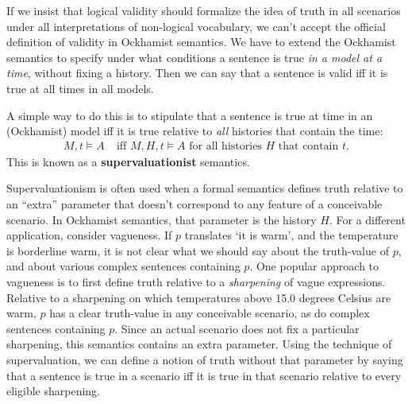 
If we insist that logical validity should formalize the idea of truth in all
scenarios under all interpretations of non-logical vocabulary, we can't
accept the official definition of validity in Ockhamist semantics. We have to
extend the Ockhamist semantics to specify under what conditions a sentence is
true \emph{in a model at a time}, without fixing a history. Then we can say that
a sentence is valid iff it is true at all times in all models.

A simple way to do this is to stipulate that a sentence is true at time in an
(Ockhamist) model iff it is true relative to \emph{all} histories that contain
the time:
\begin{align*}
  M,t \models A & \;\text{iff $M,H,t \models A$ for all histories $H$ that contain $t$}.
\end{align*}
This is known as a \textbf{supervaluationist} semantics.

Supervaluationism is often used when a formal semantics defines truth relative
to an ``extra'' parameter that doesn't correspond to any feature of a
conceivable scenario. In Ockhamist semantics, that parameter is the history $H$.
For a different application, consider vagueness. If $p$ translates `it is warm',
and the temperature is borderline warm, it is not clear what we should say about
the truth-value of $p$, and about various complex sentences containing $p$. One
popular approach to vagueness is to first define truth relative to a
\emph{sharpening} of vague expressions. Relative to a sharpening on which
temperatures above 15.0 degrees Celsius are warm, $p$ has a clear truth-value in
any conceivable scenario, as do complex sentences containing $p$. Since an
actual scenario does not fix a particular sharpening, this semantics contains an
extra parameter. Using the technique of supervaluation, we can define a
notion of truth without that parameter by saying that a sentence is true in a
scenario iff it is true in that scenario relative to every eligible sharpening.

